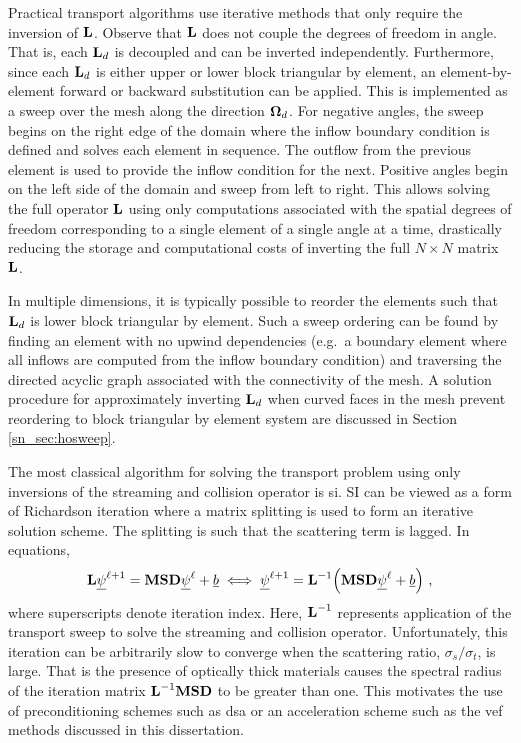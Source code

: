 \documentclass[../doc.tex]{subfiles}
\begin{document}
Practical transport algorithms use iterative methods that only require the inversion of $\boldsymbol{\mathrm{L}}$. Observe that $\boldsymbol{\mathrm{L}}$ does not couple the degrees of freedom in angle. That is, each $\boldsymbol{\mathrm{L}}_d$ is decoupled and can be inverted independently. Furthermore, since each $\boldsymbol{\mathrm{L}}_d$ is either upper or lower block triangular by element, an element-by-element forward or backward substitution can be applied. This is implemented as a sweep over the mesh along the direction $\boldsymbol{\Omega}_d$. For negative angles, the sweep begins on the right edge of the domain where the inflow boundary condition is defined and solves each element in sequence. The outflow from the previous element is used to provide the inflow condition for the next. Positive angles begin on the left side of the domain and sweep from left to right. This allows solving the full operator $\boldsymbol{\mathrm{L}}$ using only computations associated with the spatial degrees of freedom corresponding to a single element of a single angle at a time, drastically reducing the storage and computational costs of inverting the full $N\times N$ matrix $\boldsymbol{\mathrm{L}}$. 

In multiple dimensions, it is typically possible to reorder the elements such that $\boldsymbol{\mathrm{L}}_d$ is lower block triangular by element. Such a sweep ordering can be found by finding an element with no upwind dependencies (e.g.~a boundary element where all inflows are computed from the inflow boundary condition) and traversing the directed acyclic graph associated with the connectivity of the mesh. A solution procedure for approximately inverting $\boldsymbol{\mathrm{L}}_d$ when curved faces in the mesh prevent reordering to block triangular by element system are discussed in Section \ref{sn_sec:hosweep}.  

The most classical algorithm for solving the transport problem using only inversions of the streaming and collision operator is \gls{si}. SI can be viewed as a form of Richardson iteration where a matrix splitting is used to form an iterative solution scheme. The splitting is such that the scattering term is lagged. In equations, 
	\begin{equation} \label{sn:sourceiteration}
		\boldsymbol{\mathrm{L}}\underline{\psi}^{\ell+1} = \boldsymbol{\mathrm{M}}\boldsymbol{\mathrm{S}}\boldsymbol{\mathrm{D}}\underline{\psi}^\ell + \underline{b} \iff \underline{\psi}^{\ell+1} = \boldsymbol{\mathrm{L}}^{-1}\!\left( \boldsymbol{\mathrm{M}}\boldsymbol{\mathrm{S}}\boldsymbol{\mathrm{D}}\underline{\psi}^\ell + \underline{b} \right) \,, 
	\end{equation}
where superscripts denote iteration index. Here, $\boldsymbol{\mathrm{L}}^{-1}$ represents application of the transport sweep to solve the streaming and collision operator. Unfortunately, this iteration can be arbitrarily slow to converge when the scattering ratio, $\sigma_s/\sigma_t$, is large. That is the presence of optically thick materials causes the spectral radius of the iteration matrix $\boldsymbol{\mathrm{L}}^{-1}\boldsymbol{\mathrm{M}}\boldsymbol{\mathrm{S}}\boldsymbol{\mathrm{D}}$ to be greater than one. This motivates the use of preconditioning schemes such as \gls{dsa} or an acceleration scheme such as the \gls{vef} methods discussed in this dissertation. 
\end{document}
